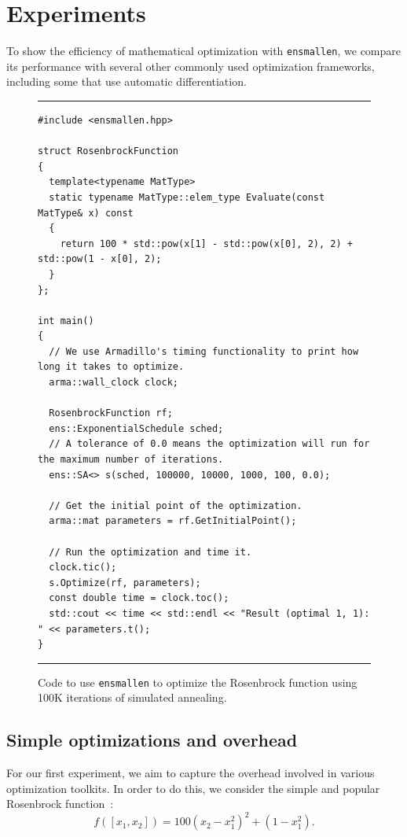 \section{Experiments}
\label{sec:experiments}

To show the efficiency of mathematical optimization with {\tt ensmallen}, we
compare its performance with several other commonly used optimization
frameworks, including some that use automatic differentiation.

\begin{figure}[t!]
\hrule
\vspace{1ex}
\begin{verbatim}
#include <ensmallen.hpp>

struct RosenbrockFunction
{
  template<typename MatType>
  static typename MatType::elem_type Evaluate(const MatType& x) const
  {
    return 100 * std::pow(x[1] - std::pow(x[0], 2), 2) + std::pow(1 - x[0], 2);
  }
};

int main()
{
  // We use Armadillo's timing functionality to print how long it takes to optimize.
  arma::wall_clock clock;

  RosenbrockFunction rf;
  ens::ExponentialSchedule sched;
  // A tolerance of 0.0 means the optimization will run for the maximum number of iterations.
  ens::SA<> s(sched, 100000, 10000, 1000, 100, 0.0);

  // Get the initial point of the optimization.
  arma::mat parameters = rf.GetInitialPoint();

  // Run the optimization and time it.
  clock.tic();
  s.Optimize(rf, parameters);
  const double time = clock.toc();
  std::cout << time << std::endl << "Result (optimal 1, 1): " << parameters.t();
}
\end{verbatim}
\hrule
\vspace*{-0.5em}
\caption{Code to use {\tt ensmallen} to optimize the Rosenbrock function using
100K iterations of simulated annealing.}
\label{fig:rosenbrock_run}
\end{figure}

\subsection{Simple optimizations and overhead}

For our first experiment, we aim to capture the overhead involved in various
optimization toolkits.  In order to do this, we consider the simple and popular
Rosenbrock function~\cite{Rosenbrock1960}:
%
\begin{equation}
f([x_1, x_2]) = 100 (x_2 - x_1^2)^2 + (1 - x_1^2).
\end{equation}

